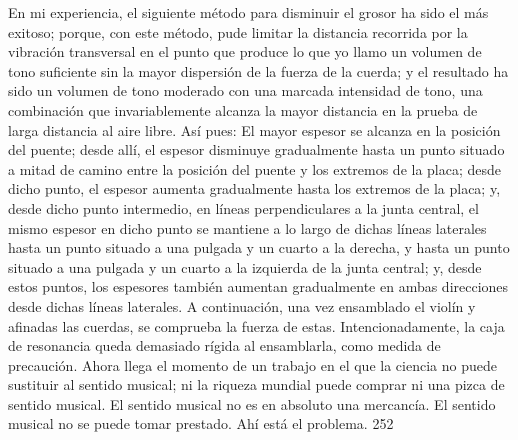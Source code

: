 En mi experiencia, el siguiente método para disminuir el grosor ha sido el más exitoso; porque, con este método, pude limitar la distancia recorrida por la vibración transversal en el punto que produce lo que yo llamo un volumen de tono suficiente sin la mayor dispersión de la fuerza de la cuerda; y el resultado ha sido un volumen de tono moderado con una marcada intensidad de tono, una combinación que invariablemente alcanza la mayor distancia en la prueba de larga distancia al aire libre.
Así pues: El mayor espesor se alcanza en la posición del puente; desde allí, el espesor disminuye gradualmente hasta un punto situado a mitad de camino entre la posición del puente y los extremos de la placa; desde dicho punto, el espesor aumenta gradualmente hasta los extremos de la placa; y, desde dicho punto intermedio, en líneas perpendiculares a la junta central, el mismo espesor en dicho punto se mantiene a lo largo de dichas líneas laterales hasta un punto situado a una pulgada y un cuarto a la derecha, y hasta un punto situado a una pulgada y un cuarto a la izquierda de la junta central; y, desde estos puntos, los espesores también aumentan gradualmente en ambas direcciones desde dichas líneas laterales.
A continuación, una vez ensamblado el violín y afinadas las cuerdas, se comprueba la fuerza de estas. Intencionadamente, la caja de resonancia queda demasiado rígida al ensamblarla, como medida de precaución.
Ahora llega el momento de un trabajo en el que la ciencia no puede sustituir al sentido musical; ni la riqueza mundial puede comprar ni una pizca de sentido musical. El sentido musical no es en absoluto una mercancía. El sentido musical no se puede tomar prestado.
Ahí está el problema.
252

